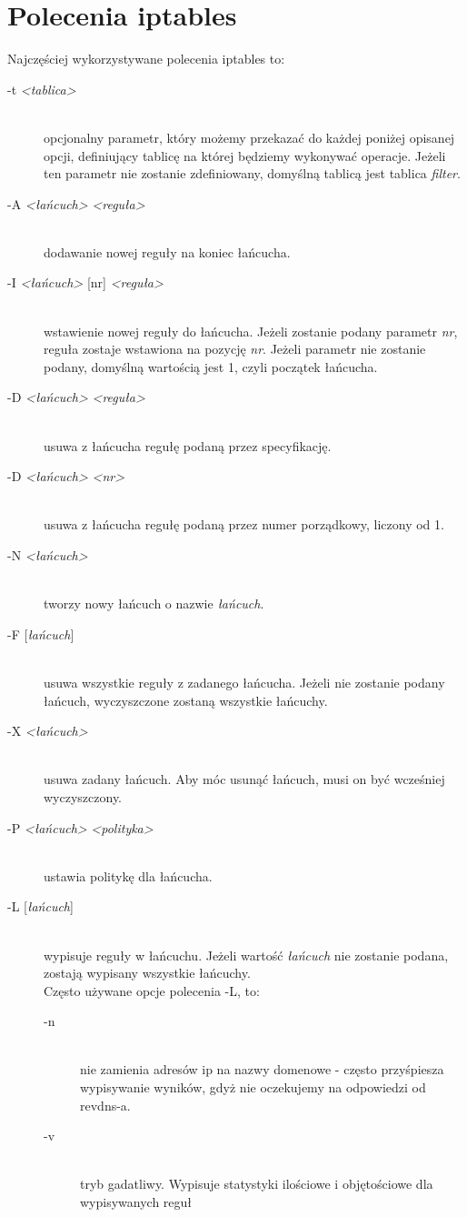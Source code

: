 \documentclass[a4paper,12pt]{book}
\newcommand{\param}[1]{\textit{\textless #1\textgreater}}
\begin{document}
	\section{Polecenia iptables}
		Najczęściej wykorzystywane polecenia iptables to:
		\begin{description}
			\item[-t \param{tablica}] \hfill \\
				opcjonalny parametr, który możemy przekazać do każdej poniżej opisanej opcji, definiujący tablicę na której będziemy wykonywać operacje.
				Jeżeli ten parametr nie zostanie zdefiniowany, domyślną tablicą jest tablica \textit{filter}.
			\item[-A \param{łańcuch} \param{reguła}] \hfil \\
				dodawanie nowej reguły na koniec łańcucha.
			\item[-I \param{łańcuch} {[nr]} \param{reguła}] \hfill \\
				wstawienie nowej reguły do łańcucha. Jeżeli zostanie podany parametr \textit{nr}, reguła zostaje wstawiona na pozycję \textit{nr}.
				Jeżeli parametr nie zostanie podany, domyślną wartością jest 1, czyli początek łańcucha.
			\item[-D \param{łańcuch} \param{reguła}] \hfill \\
				usuwa z łańcucha regułę podaną przez specyfikację.
			\item[-D \param{łańcuch} \param{nr}] \hfill \\
				usuwa z łańcucha regułę podaną przez numer porządkowy, liczony od 1.
			\item[-N \param{łańcuch}] \hfill \\
				tworzy nowy łańcuch o nazwie \textit{łańcuch}.
			\item[-F {[\textit{łańcuch}]}] \hfill \\
				usuwa wszystkie reguły z zadanego łańcucha. Jeżeli nie zostanie podany łańcuch, wyczyszczone zostaną wszystkie łańcuchy.
			\item[-X \param{łańcuch}] \hfill \\
				usuwa zadany łańcuch. Aby móc usunąć łańcuch, musi on być wcześniej wyczyszczony.	
			\item[-P \param{łańcuch} \param{polityka}] \hfill \\
				ustawia politykę dla łańcucha.
			\item[-L {[\textit{łańcuch}]}] \hfill \\
				wypisuje reguły w łańcuchu. Jeżeli wartość \textit{łańcuch} nie zostanie podana, zostają wypisany wszystkie łańcuchy.\\
				Często używane opcje polecenia -L, to:
				\begin{description}
					\item[-n] \hfill \\
						nie zamienia adresów ip na nazwy domenowe - często przyśpiesza wypisywanie wyników, gdyż nie oczekujemy na odpowiedzi od revdns-a.
					\item[-v] \hfill \\
						tryb gadatliwy. Wypisuje statystyki ilościowe i objętościowe dla wypisywanych reguł
				\end{description}
		\end{description}
\end{document}
